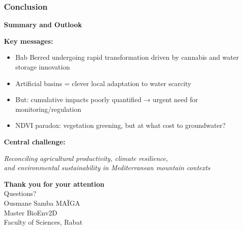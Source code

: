 \documentclass{beamer}
\begin{document}
\begin{frame}
\frametitle{Conclusion}
\begin{center}
  \textbf{\Large{Summary and Outlook}}
\end{center}

\textbf{Key messages:}
\begin{itemize}
  \item Bab Berred undergoing rapid transformation driven by cannabis and water storage innovation
  \item Artificial basins = clever local adaptation to water scarcity
  \item But: cumulative impacts poorly quantified → urgent need for monitoring/regulation
  \item NDVI paradox: vegetation greening, but at what cost to groundwater?
\end{itemize}

\textbf{Central challenge:}
\begin{center}
  \textit{Reconciling agricultural productivity, climate resilience, \\ and environmental sustainability in Mediterranean mountain contexts}
\end{center}
\end{frame}

\begin{frame}[plain]
\begin{center}
  \vfill
  {\Huge \textbf{Thank you for your attention}}
  \\[1cm]
  {\Large Questions?}
  \\[2cm]
  \small{
    Ousmane Samba MAÏGA \\
    Master BioEnv2D \\
    Faculty of Sciences, Rabat
  }
  \vfill
\end{center}
\end{frame}
\end{document}
